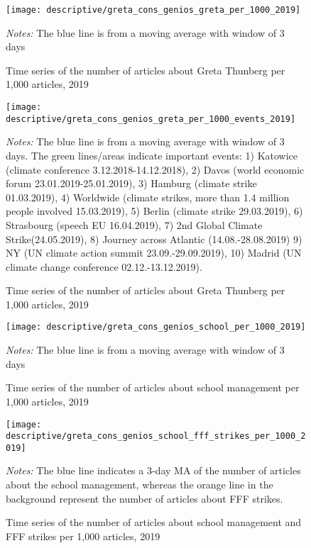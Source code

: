 \documentclass[11pt, a4paper]{article} %
\begin{document}
\begin{figure}[H]\centering
	\caption{Time series of the number of articles about Greta Thunberg per 1,000 articles, 2019}
	\texttt{[image: descriptive/greta\_cons\_genios\_greta\_per\_1000\_2019]}
	\begin{minipage}{\linewidth}
		\scriptsize{\emph{Notes:} The blue line is from a moving average with window of 3 days}
	\end{minipage}
\end{figure}


\begin{figure}[H]\centering
	\caption{Time series of the number of articles about Greta Thunberg per 1,000 articles, 2019}
	\texttt{[image: descriptive/greta\_cons\_genios\_greta\_per\_1000\_events\_2019]}
	\begin{minipage}{\linewidth}
		\scriptsize{\emph{Notes:} The blue line is from a moving average with window of 3 days. The green lines/areas indicate important events: 1) Katowice (climate conference 3.12.2018-14.12.2018), 2) Davos (world economic forum 23.01.2019-25.01.2019), 3) Hamburg (climate strike 01.03.2019), 4) Worldwide (climate strikes, more than 1.4 million people involved 15.03.2019), 5) Berlin (climate strike 29.03.2019), 6) Strasbourg (speech EU 16.04.2019), 7) 2nd Global Climate Strike(24.05.2019),	8) Journey across Atlantic (14.08.-28.08.2019) 9) NY (UN climate action summit 23.09.-29.09.2019), 10) Madrid (UN climate change conference 02.12.-13.12.2019).}
	\end{minipage}
\end{figure}


\begin{figure}[H]\centering
	\caption{Time series of the number of articles about school management per 1,000 articles, 2019}
	\texttt{[image: descriptive/greta\_cons\_genios\_school\_per\_1000\_2019]}
	\begin{minipage}{\linewidth}
		\scriptsize{\emph{Notes:} The blue line is from a moving average with window of 3 days}
	\end{minipage}
\end{figure}

\begin{figure}[H]\centering
	\caption{Time series of the number of articles about school management and FFF strikes per 1,000 articles, 2019}
	\texttt{[image: descriptive/greta\_cons\_genios\_school\_fff\_strikes\_per\_1000\_2019]}
	\begin{minipage}{\linewidth}
		\scriptsize{\emph{Notes:} The blue line indicates a 3-day MA of the number of articles about the school management, whereas the orange line in the background represent the number of articles about FFF strikes.}
	\end{minipage}
\end{figure}
\end{document}
